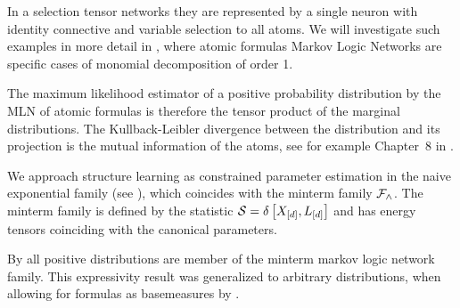 In a selection tensor networks they are represented by a single neuron with identity connective and variable selection to all atoms.
We will investigate such examples in more detail in , where atomic formulas Markov Logic Networks are specific cases of monomial decomposition of order 1.

The maximum likelihood estimator of a positive probability distribution by the MLN of atomic formulas is therefore the tensor product of the marginal distributions.
The Kullback-Leibler divergence between the distribution and its projection is the mutual information of the atoms, see for example Chapter~8 in \cite{mackay_information_2003}.

\begin{remark}
\end{remark}







We approach structure learning as constrained parameter estimation in the naive exponential family (see ), which coincides with the minterm family $\mathcal{F}_{\land}$.
The minterm family is defined by the statistic $\mathcal{S} = \delta\left[X_{[d]}, L_{[d]}\right]$ and has energy tensors coinciding with the canonical parameters.



By  all positive distributions are member of the minterm markov logic network family.
This expressivity result was generalized to arbitrary distributions, when allowing for formulas as basemeasures by .

